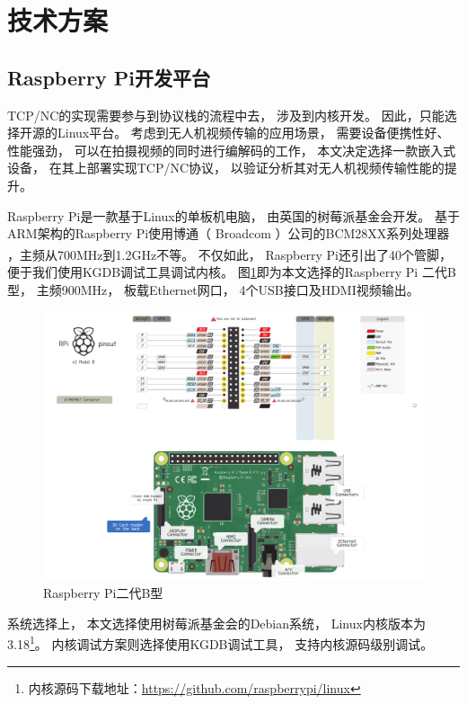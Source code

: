 \section{技术方案}
\subsection{Raspberry Pi开发平台}
TCP/NC的实现需要参与到协议栈的流程中去，
涉及到内核开发。
因此，只能选择开源的Linux平台。
考虑到无人机视频传输的应用场景，
需要设备便携性好、性能强劲，
可以在拍摄视频的同时进行编解码的工作，
本文决定选择一款嵌入式设备，
在其上部署实现TCP/NC协议，
以验证分析其对无人机视频传输性能的提升。
\par
Raspberry Pi是一款基于Linux的单板机电脑，
由英国的树莓派基金会开发。
基于ARM架构的Raspberry Pi使用博通（ Broadcom ）公司的BCM28XX系列处理器
，主频从700MHz到1.2GHz不等\textsuperscript{\cite{rasp}}。
不仅如此，
Raspberry Pi还引出了40个管脚，
便于我们使用KGDB调试工具调试内核。
图\ref{RASP_EPS}即为本文选择的Raspberry Pi 二代B型，
主频900MHz，
板载Ethernet网口，
4个USB接口及HDMI视频输出。
\begin{figure}[htbp]
	\centering
\includegraphics[width=6in]{figures/rasp.pdf}
\caption{Raspberry Pi二代B型}
\label{RASP_EPS}
\end{figure}
系统选择上，
本文选择使用树莓派基金会的Debian系统，
Linux内核版本为3.18\footnote{内核源码下载地址：\url{https://github.com/raspberrypi/linux}}。
内核调试方案则选择使用KGDB调试工具，
支持内核源码级别调试。
